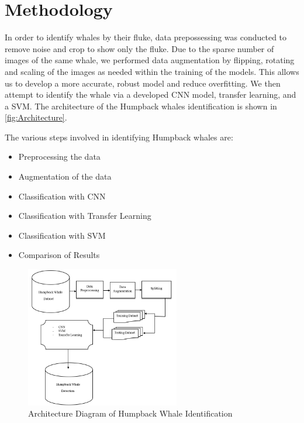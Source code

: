 \documentclass[paper=a4, fontsize=11pt]{scrartcl}
\numberwithin{equation}{section}		%
\numberwithin{table}{section}				%
\begin{document}
\section{Methodology}\label{sec: meth}



In order to identify whales by their fluke, data prepossessing was conducted to remove noise and crop to show only the fluke. Due to the sparse number of images of the same whale, we performed data augmentation by flipping, rotating and scaling of the images as needed within the training of the models. This allows us to develop a more accurate, robust model and reduce overfitting. We then attempt to identify the whale via a developed CNN model, transfer learning, and a SVM. The architecture of the Humpback whales identification is shown in \autoref{fig:Architecture}. 

The various steps involved in  identifying Humpback whales are:
\begin{itemize}
    \item Preprocessing the data
    \item Augmentation of the data
    \item Classification with CNN
    \item Classification with Transfer Learning
    \item Classification with SVM
    \item Comparison of Results
\end{itemize}

\begin{figure}[H]
    \centering
    \includegraphics[width=0.6\textwidth]{Architecture.PNG}
    \caption{Architecture Diagram of Humpback Whale Identification }
    \label{fig:Architecture}
\end{figure}
\end{document}
